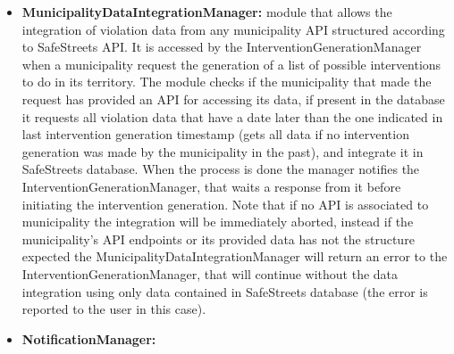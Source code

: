 \begin{itemize}
	\item \textbf{MunicipalityDataIntegrationManager:}
	module that allows the integration of violation data from any municipality API structured according to SafeStreets API. It is accessed by the InterventionGenerationManager when a municipality request the generation of a list of possible interventions to do in its territory. The module checks if the municipality that made the request has provided an API for accessing its data, if present in the database it requests all violation data that have a date later than the one indicated in last intervention generation timestamp (gets all data if no intervention generation was made by the municipality in the past), and integrate it in SafeStreets database. When the process is done the manager notifies the InterventionGenerationManager, that waits a response from it before initiating the intervention generation. Note that if no API is associated to municipality the integration will be immediately aborted, instead if the municipality's API endpoints or its provided data has not the structure expected the MunicipalityDataIntegrationManager will return an error to the InterventionGenerationManager, that will continue without the data integration using only data contained in SafeStreets database (the error is reported to the user in this case). 
	\item \textbf{NotificationManager:}
\end{itemize}
